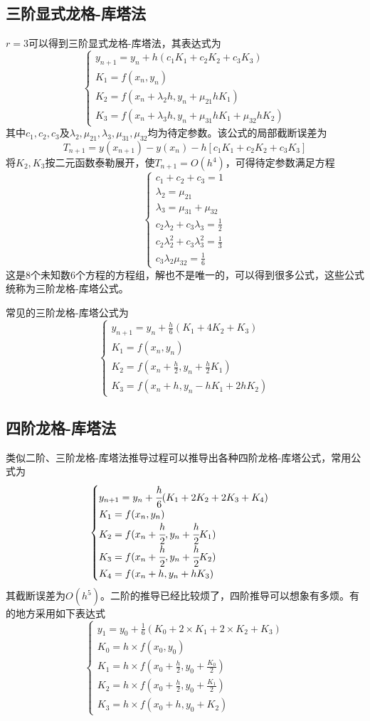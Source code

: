 \subsection{三阶显式龙格-库塔法}
$r=3$可以得到三阶显式龙格-库塔法，其表达式为
$$\begin{cases}
y_{n+1}=y_n+h(c_1K_1+c_2K_2+c_3K_3)\\
K_1=f(x_n,y_n)\\
K_2=f(x_n+\lambda_2h,y_n+\mu_{21}hK_1)\\
K_3=f(x_n+\lambda_3h,y_n+\mu_{31}hK_1+\mu_{32}hK_2)
\end{cases}$$
其中$c_1,c_2,c_3$及$\lambda_2,\mu_{21},\lambda_3,\mu_{31},\mu_{32}$均为待定参数。该公式的局部截断误差为
$$T_{n+1}=y(x_{n+1})-y(x_n)-h[c_1K_1+c_2K_2+c_3K_3]$$
将$K_2,K_3$按二元函数泰勒展开，使$T_{n+1}=O(h^4)$，可得待定参数满足方程
$$\begin{cases}
c_1+c_2+c_3=1\\
\lambda_2=\mu_{21}\\
\lambda_3=\mu_{31}+\mu_{32}\\
c_2\lambda_2+c_3\lambda_3=\frac{1}{2}\\
c_2\lambda_2^2+c_3\lambda_3^2=\frac{1}{3}\\
c_3\lambda_2\mu_{32}=\frac{1}{6}
\end{cases}$$
这是8个未知数6个方程的方程组，解也不是唯一的，可以得到很多公式，这些公式统称为三阶龙格-库塔公式。

常见的三阶龙格-库塔公式为
$$\begin{cases}
y_{n+1}=y_n+\frac{h}{6}(K_1+4K_2+K_3)\\
K_1=f(x_n,y_n)\\
K_2=f(x_n+\frac{h}{2},y_n+\frac{h}{2}K_1)\\
K_3=f(x_n+h,y_n-hK_1+2hK_2)
\end{cases}$$



\subsection{四阶龙格-库塔法}
类似二阶、三阶龙格-库塔法推导过程可以推导出各种四阶龙格-库塔公式，常用公式为
$$\begin{cases}
y_{n+1}=y_n+\cfrac{h}{6}(K_1+2K_2+2K_3+K_4)\\
K_1=f(x_n,y_n)\\
K_2=f(x_n+\cfrac{h}{2},y_n+\cfrac{h}{2}K_1)\\
K_3=f(x_n+\cfrac{h}{2},y_n+\cfrac{h}{2}K_2)\\
K_4=f(x_n+h,y_n+hK_3)
\end{cases}
$$
其截断误差为$O(h^5)$。二阶的推导已经比较烦了，四阶推导可以想象有多烦。有的地方采用如下表达式
$$\begin{cases}y_1=y_0+\frac{1}{6}(K_0+2\times K_1 +2\times K_2 + K_3)\\
K_0=h \times f(x_0,y_0)\\
K_1=h \times f(x_0+\frac{h}{2},y_0+\frac{K_0}{2})\\
K_2=h \times f(x_0+\frac{h}{2},y_0+\frac{K_1}{2})\\
K_3=h \times f(x_0+h,y_0+K_2)
\end{cases}$$



